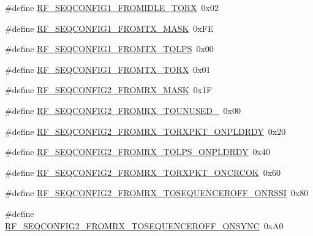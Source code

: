\begin{DoxyCompactItemize}
\item 
\#define \mbox{\hyperlink{sx1276_regs-_fsk_8h_a327106f766ae675b2410b0a8c90d8627}{R\+F\+\_\+\+S\+E\+Q\+C\+O\+N\+F\+I\+G1\+\_\+\+F\+R\+O\+M\+I\+D\+L\+E\+\_\+\+T\+O\+RX}}~0x02
\item 
\#define \mbox{\hyperlink{sx1276_regs-_fsk_8h_a8d9a8b1cebb2d1f6da7eb71779c62562}{R\+F\+\_\+\+S\+E\+Q\+C\+O\+N\+F\+I\+G1\+\_\+\+F\+R\+O\+M\+T\+X\+\_\+\+M\+A\+SK}}~0x\+FE
\item 
\#define \mbox{\hyperlink{sx1276_regs-_fsk_8h_a55d5e49e5d8ebda93a64135e6f0cd9d7}{R\+F\+\_\+\+S\+E\+Q\+C\+O\+N\+F\+I\+G1\+\_\+\+F\+R\+O\+M\+T\+X\+\_\+\+T\+O\+L\+PS}}~0x00
\item 
\#define \mbox{\hyperlink{sx1276_regs-_fsk_8h_a8af68d94c1ffd6f3cf982a475f07208e}{R\+F\+\_\+\+S\+E\+Q\+C\+O\+N\+F\+I\+G1\+\_\+\+F\+R\+O\+M\+T\+X\+\_\+\+T\+O\+RX}}~0x01
\item 
\#define \mbox{\hyperlink{sx1276_regs-_fsk_8h_a297c55a1f13050a1b8b4a9656dee1bee}{R\+F\+\_\+\+S\+E\+Q\+C\+O\+N\+F\+I\+G2\+\_\+\+F\+R\+O\+M\+R\+X\+\_\+\+M\+A\+SK}}~0x1F
\item 
\#define \mbox{\hyperlink{sx1276_regs-_fsk_8h_adafa898afe4ea546849d24b47fab63e9}{R\+F\+\_\+\+S\+E\+Q\+C\+O\+N\+F\+I\+G2\+\_\+\+F\+R\+O\+M\+R\+X\+\_\+\+T\+O\+U\+N\+U\+S\+E\+D\+\_}}~0x00
\item 
\#define \mbox{\hyperlink{sx1276_regs-_fsk_8h_ae7a4ee5cace860cabada5e5696f0d2f4}{R\+F\+\_\+\+S\+E\+Q\+C\+O\+N\+F\+I\+G2\+\_\+\+F\+R\+O\+M\+R\+X\+\_\+\+T\+O\+R\+X\+P\+K\+T\+\_\+\+O\+N\+P\+L\+D\+R\+DY}}~0x20
\item 
\#define \mbox{\hyperlink{sx1276_regs-_fsk_8h_a39d97dcfbbf843fa3ed39b8684382fc2}{R\+F\+\_\+\+S\+E\+Q\+C\+O\+N\+F\+I\+G2\+\_\+\+F\+R\+O\+M\+R\+X\+\_\+\+T\+O\+L\+P\+S\+\_\+\+O\+N\+P\+L\+D\+R\+DY}}~0x40
\item 
\#define \mbox{\hyperlink{sx1276_regs-_fsk_8h_a15da62d2433f1464b5ed139af3bf2f43}{R\+F\+\_\+\+S\+E\+Q\+C\+O\+N\+F\+I\+G2\+\_\+\+F\+R\+O\+M\+R\+X\+\_\+\+T\+O\+R\+X\+P\+K\+T\+\_\+\+O\+N\+C\+R\+C\+OK}}~0x60
\item 
\#define \mbox{\hyperlink{sx1276_regs-_fsk_8h_a8da00c89f8cbc3168a1eef6440c76427}{R\+F\+\_\+\+S\+E\+Q\+C\+O\+N\+F\+I\+G2\+\_\+\+F\+R\+O\+M\+R\+X\+\_\+\+T\+O\+S\+E\+Q\+U\+E\+N\+C\+E\+R\+O\+F\+F\+\_\+\+O\+N\+R\+S\+SI}}~0x80
\item 
\#define \mbox{\hyperlink{sx1276_regs-_fsk_8h_a1d5b9abdda18dcf97144ee55420e9c63}{R\+F\+\_\+\+S\+E\+Q\+C\+O\+N\+F\+I\+G2\+\_\+\+F\+R\+O\+M\+R\+X\+\_\+\+T\+O\+S\+E\+Q\+U\+E\+N\+C\+E\+R\+O\+F\+F\+\_\+\+O\+N\+S\+Y\+NC}}~0x\+A0

\end{DoxyCompactItemize}
